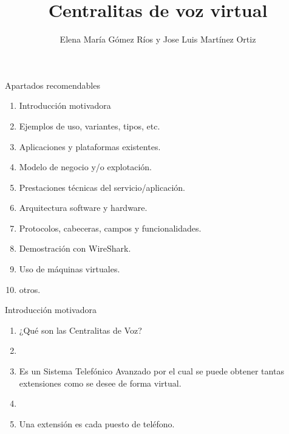 \documentclass[11pt]{beamer}
\author{Elena María Gómez Ríos y Jose Luis Martínez Ortiz}
\title{Centralitas de voz virtual} %
\begin{document}
\begin{frame}
\titlepage
\end{frame}


\begin{frame}{Apartados recomendables}
\begin{enumerate}
\item Introducción motivadora
\item Ejemplos de uso, variantes, tipos, etc.
\item Aplicaciones y plataformas existentes.
\item Modelo de negocio y/o explotación.
\item Prestaciones técnicas del servicio/aplicación.
\item Arquitectura software y hardware.
\item Protocolos, cabeceras, campos y funcionalidades.
\item Demostración con WireShark.
\item Uso de máquinas virtuales.
\item otros.
\end{enumerate}
\end{frame}


\begin{frame}{Introducción motivadora}
\begin{enumerate}[]
\item \begin{center}
¿Qué son las Centralitas de Voz?
\end{center}
\item 
\item \begin{center}
Es un Sistema Telefónico Avanzado por el cual se puede obtener tantas extensiones como se desee
de forma virtual.
\end{center}
\item 
\item \begin{center}
Una extensión es cada puesto de teléfono.
\end{center}

\end{enumerate}
\end{frame}
\end{document}
